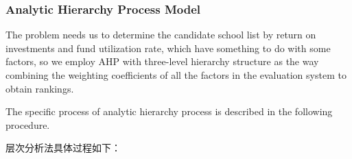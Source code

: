 \subsubsection{Analytic Hierarchy Process Model}
The problem needs us to determine the candidate school list by return on investments and fund utilization rate, which have something to do with some factors, so we employ AHP with three-level hierarchy structure as the way combining the weighting coefficients of all the factors in the evaluation system to obtain rankings.\par
The specific process of analytic hierarchy process is described in the following procedure.\par
层次分析法具体过程如下：
